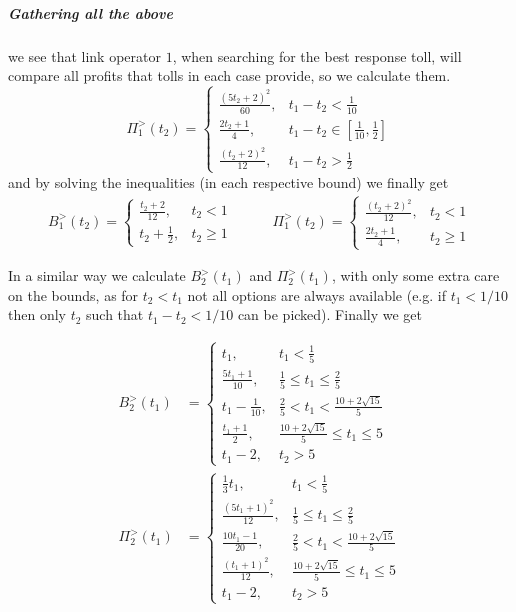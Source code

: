 \documentclass[10pt,a4paper]{book}
\theoremstyle{definition}
\theoremstyle{comment}
\begin{document}
\subparagraph{Gathering all the above} we see that link operator $1$, when searching for the best response toll, will compare all profits that tolls in each case provide, so we calculate them.
\[
	\Pi_1^>(t_2) =
	\begin{cases}
		\frac{(5 t_2 + 2)^2}{60}, & t_1 - t_2 < \frac1{10} \\
		\frac{2 t_2 + 1}4, & t_1 - t_2 \in \left[\frac1{10}, \frac12\right] \\
		\frac{(t_2 + 2)^2}{12}, & t_1 - t_2 > \frac12
	\end{cases}
\]
and by solving the inequalities (in each respective bound) we finally get
\begin{equation*}
	\begin{aligned}
		B_1^>(t_2) =
		\begin{cases}
			\frac{t_2 + 2}{12}, & t_2 < 1 \\
			t_2 + \frac12, & t_2 \ge 1
		\end{cases}
	\end{aligned}
	\qquad
	\begin{aligned}
		\Pi_1^>(t_2) =
		\begin{cases}
			\frac{(t_2 + 2)^2}{12}, & t_2 < 1 \\
			\frac{2 t_2 + 1}4, & t_2 \ge 1
		\end{cases}
	\end{aligned}
\end{equation*}

In a similar way we calculate $B_2^>(t_1)$ and $\Pi_2^>(t_1)$, with only some extra care on the bounds, as for $t_2 < t_1$ not all options are always available (e.g. if $t_1 < 1/10$ then only $t_2$ such that $t_1 - t_2 < 1/10$ can be picked).
Finally we get

\begin{align*}
	B_2^>(t_1) &=
	\begin{cases}
		t_1, & t_1 < \frac15 \\
		\frac{5 t_1 + 1}{10}, & \frac15 \le t_1 \le \frac25 \\
		t_1 - \frac1{10}, & \frac25 < t_1 < \frac{10 + 2 \sqrt{15}}5 \\
		\frac{t_1 + 1}2, & \frac{10 + 2 \sqrt{15}}5 \le t_1 \le 5 \\
		t_1 - 2, & t_2 > 5
	\end{cases} \\[10pt]
	\Pi_2^>(t_1) &=
	\begin{cases}
		\frac13 t_1, & t_1 < \frac15 \\
		\frac{(5 t_1 + 1)^2}{12}, & \frac15 \le t_1 \le \frac25 \\
		\frac{10 t_1 - 1}{20}, & \frac25 < t_1 < \frac{10 + 2 \sqrt{15}}5 \\
		\frac{(t_1 + 1)^2}{12}, & \frac{10 + 2 \sqrt{15}}5 \le t_1 \le 5 \\
		t_1 - 2, & t_2 > 5
	\end{cases}
\end{align*}
\end{document}
